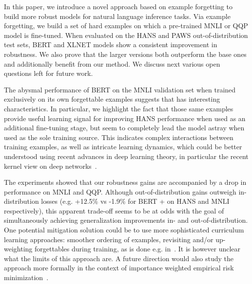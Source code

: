 In this paper, we introduce a novel approach based on example forgetting to build more robust models for natural language inference tasks. Via example forgetting, we build a set of hard examples on which a pre-trained MNLI or QQP  model is fine-tuned. When evaluated on the HANS and PAWS out-of-distribution test sets, BERT and XLNET models show a consistent improvement in robustness. We also prove that the larger versions both outperform the base ones and additionally benefit from our method. We discuss next various open questions left for future work.

The abysmal performance of BERT on the MNLI validation set when trained exclusively on its own forgettable examples suggests that \fbert has interesting characteristics. In particular, we highlight the fact that those same examples provide useful learning signal for improving HANS performance when used as an additional fine-tuning stage, but seem to completely lead the model astray when used as the sole training source. This indicates complex interactions between training examples, as well as intricate learning dynamics, which could be better understood using recent advances in deep learning theory, in particular the recent kernel view on deep networks~\citep{jacot2018neural}.




The experiments showed that our robustness gains are accompanied by a drop in performance on MNLI and QQP.  Although out-of-distribution gains outweigh in-distribution losses (e.g. +12.5\% vs \mbox{-1.9\%} for BERT + \fbow on HANS and MNLI respectively), %
this apparent trade-off seems to be at odds with the goal of simultaneously achieving generalization improvements in- and out-of-distribution. One potential mitigation solution could be to use more sophisticated curriculum learning approaches: smoother ordering of examples, revisiting and/or up-weighting forgettables during training, as is done e.g. in~\citet{clark2019dont,he2019unlearn}. It is however unclear what the limits of this approach are. A future direction would also study the approach more formally in the context of importance weighted empirical risk minimization~\citep{sugiyama2007covariate}.

